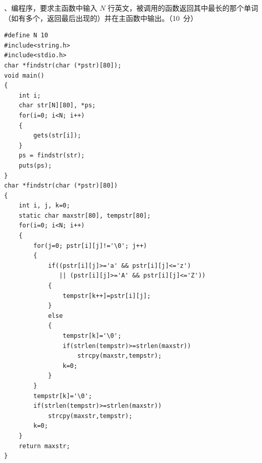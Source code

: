 \documentclass[UTF8,a4paper,10.5pt]{ctexart}
\begin{document}
\medskip
{}、编程序，要求主函数中输入 $N$ 行英文，被调用的函数返回其中最长的那个单词（如有多个，返回最后出现的）并在主函数中输出。（10~分）
\begin{lstlisting}
#define N 10
#include<string.h>
#include<stdio.h>
char *findstr(char (*pstr)[80]);
void main()
{
    int i;
    char str[N][80], *ps;
    for(i=0; i<N; i++)
    {
        gets(str[i]);
    }
    ps = findstr(str);
    puts(ps);
}
char *findstr(char (*pstr)[80])
{
    int i, j, k=0;
    static char maxstr[80], tempstr[80];
    for(i=0; i<N; i++)
    {
        for(j=0; pstr[i][j]!='\0'; j++)
        {
            if((pstr[i][j]>='a' && pstr[i][j]<='z')
               || (pstr[i][j]>='A' && pstr[i][j]<='Z'))
            {
                tempstr[k++]=pstr[i][j];
            }
            else
            {
                tempstr[k]='\0';
                if(strlen(tempstr)>=strlen(maxstr))
                    strcpy(maxstr,tempstr);
                k=0;
            }
        }
        tempstr[k]='\0';
        if(strlen(tempstr)>=strlen(maxstr))
            strcpy(maxstr,tempstr);
        k=0;
    }
    return maxstr;
}
\end{lstlisting}
\end{document}
